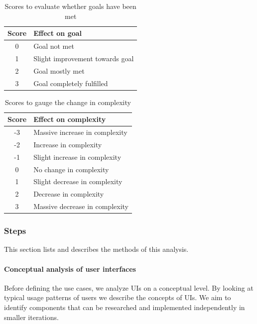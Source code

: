 \begin{table}
  \begin{center}
    \begin{tabular}{|c|l|}
      \hline
      Score & Effect on goal \\
      \hline
      0 & Goal not met \\
      1 & Slight improvement towards goal \\
      2 & Goal mostly met \\
      3 & Goal completely fulfilled \\
      \hline
    \end{tabular}
    \caption{Scores to evaluate whether goals have been met}
  \end{center}
\end{table}

\begin{table}
  \begin{center}
    \begin{tabular}{|c|l|}
      \hline
      Score & Effect on complexity \\
      \hline
      -3 & Massive increase in complexity \\
      -2 & Increase in complexity \\
      -1 & Slight increase in complexity \\
      0 & No change in complexity \\
      1 & Slight decrease in complexity \\
      2 & Decrease in complexity \\
      3 & Massive decrease in complexity \\
      \hline
    \end{tabular}
    \caption{Scores to gauge the change in complexity}
  \end{center}
\end{table}

\subsubsection{Steps}
This section lists and describes the methods of this analysis.

\paragraph{Conceptual analysis of user interfaces}
Before defining the use cases, we analyze UIs on a conceptual level. By looking at typical usage patterns of users we describe the concepts of UIs. We aim to identify components that can be researched and implemented independently in smaller iterations.


